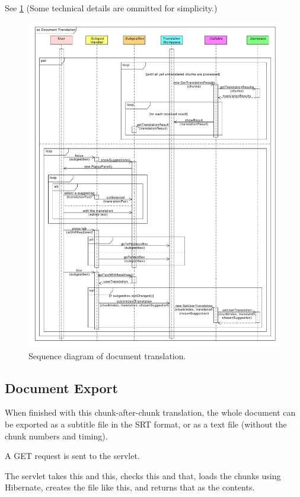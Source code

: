 See \ref{gui:sd:document_translation}
(Some technical details are ommitted for simplicity.)

\begin{figure}[h]
\begin{center}
\includegraphics[scale=0.45]{figures/document_translation_sequence.pdf}
\end{center}
\caption{Sequence diagram of document translation.}\label{gui:sd:document_translation}
\end{figure}

\subsection{Document Export}




When finished with this chunk-after-chunk translation, the whole document can be exported as a subtitle file in the SRT format, or as a text file (without the chunk numbers and timing).

A GET request is sent to the servlet.

The servlet takes this and this, checks this and that, loads the chunks using Hibernate, creates the file like this, and returns that as the contents.

